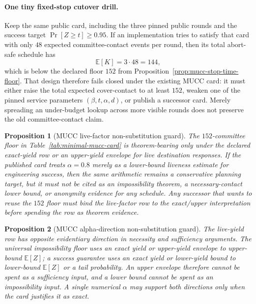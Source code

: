 \documentclass[11pt]{article}
\newtheorem{proposition}{Proposition}
\newcommand{\E}{\mathbb{E}}
\begin{document}
\paragraph{One tiny fixed-stop cutover drill.}
Keep the same public card, including the three pinned public rounds and the success target $\Pr[Z\ge t]\ge 0.95$.
If an implementation tries to satisfy that card with only $48$ expected committee-contact events per round, then its total abort-safe schedule has
\[
\E[K]=3\cdot 48 = 144,
\]
which is below the declared floor $152$ from Proposition~\ref{prop:mucc-stop-time-floor}.
That design therefore fails closed under the existing MUCC card: it must either raise the total expected cover-contact to at least $152$, weaken one of the pinned service parameters $(\beta,t,\alpha,d)$, or publish a successor card.
Merely spreading an under-budget lookup across more visible rounds does not preserve the old committee-contact claim.

\begin{proposition}[MUCC live-factor non-substitution guard]
\label{prop:mucc-live-factor-guard}
The $152$-committee floor in Table~\ref{tab:minimal-mucc-card} is theorem-bearing only under the declared exact-yield row or an upper-yield envelope for live destination responses.  If the published card treats $\alpha=0.8$ merely as a lower-bound liveness estimate for engineering success, then the same arithmetic remains a conservative planning target, but it must not be cited as an impossibility theorem, a necessary-contact lower bound, or anonymity evidence for any schedule.  Any successor that wants to reuse the $152$ floor must bind the live-factor row to the exact/upper interpretation before spending the row as theorem evidence.
\end{proposition}

\begin{proposition}[MUCC alpha-direction non-substitution guard]
\label{prop:mucc-alpha-direction-guard}
The live-yield row has opposite evidentiary direction in necessity and sufficiency arguments.  The universal impossibility floor uses an \emph{exact yield or upper-yield envelope} to upper-bound $\E[Z]$; a success guarantee uses an \emph{exact yield or lower-yield bound} to lower-bound $\E[Z]$ or a tail probability.  An upper envelope therefore cannot be spent as a sufficiency input, and a lower bound cannot be spent as an impossibility input.  A single numerical $\alpha$ may support both directions only when the card justifies it as exact.
\end{proposition}
\end{document}
